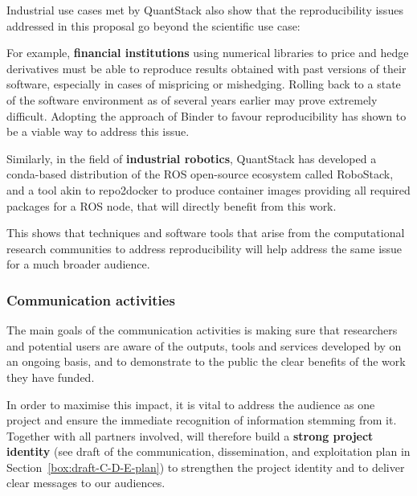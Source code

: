 Industrial use cases met by QuantStack also show that the reproducibility issues addressed in this proposal go
beyond the scientific use case:

\begin{compactitem}
\item For example, \textbf{financial institutions} using numerical libraries to price and hedge derivatives must be able
   to reproduce results obtained with past versions of their software, especially in cases of mispricing or
   mishedging. Rolling back to a state of the software environment as of several years earlier may prove
   extremely difficult. Adopting the approach of Binder to favour reproducibility has shown to be a viable way
   to address this issue.
\item Similarly, in the field of \textbf{industrial robotics}, QuantStack has developed a conda-based distribution of the
   ROS open-source ecosystem called RoboStack, and a tool akin to repo2docker to produce container images providing
   all required packages for a ROS node, that will directly benefit from this work.
\end {compactitem}

This shows that techniques and software tools that arise from the computational
research communities to address reproducibility
will help address the same issue for a much broader audience.

\subsubsection{Communication activities}

The main goals of the communication activities is making sure that researchers
and potential users are aware of the outputs, tools and services developed by \TheProject
on an ongoing basis, and to demonstrate to the public the clear benefits of the work they have funded.

In order to maximise this impact, it is vital to address the audience as one project
and ensure the immediate recognition of information stemming from it.
Together with all partners involved, \TheProject will therefore build a \textbf{strong project identity}
(see draft of the communication, dissemination, and exploitation plan in Section~\ref{box:draft-C-D-E-plan}) to strengthen the project
identity and to deliver clear messages to our audiences.

